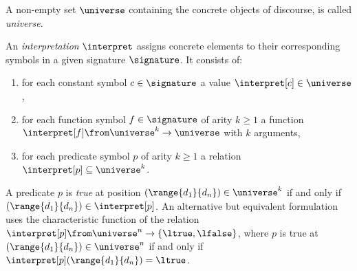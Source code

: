             \begin{definition}[Universe]
                A non-empty set $\universe$ containing the concrete objects of discourse, is called \emph{universe}.
            \end{definition}

            \begin{definition}[Interpretation]
                An \emph{interpretation} $\interpret$ assigns concrete elements to their corresponding symbols in a given signature $\signature$. It consists of:
                \begin{enumerate}
                    \item for each constant symbol $c\in\signature$ a value $\interpret[c]\in\universe$,
                    \item for each function symbol $f\in\signature$ of arity $k\geq 1$ a function $\interpret[f]\from\universe^k\to\universe$ with $k$ arguments,
                    \item for each predicate symbol $p$ of arity $k\geq 1$ a relation $\interpret[p]\subseteq\universe^k$.
                \end{enumerate}
            \end{definition}


            A predicate $p$ is \emph{true} at position $(\range{d_1}{d_n})\in\universe^k$ if and only if $(\range{d_1}{d_n})\in\interpret[p]$.
            An alternative but equivalent formulation uses the characteristic function of the relation $\interpret[p]\from\universe^n\to\{\ltrue,\lfalse\}$, where $p$ is true at $(\range{d_1}{d_n})\in\universe^n$ if and only if $\interpret[p](\range{d_1}{d_n})=\ltrue$.




